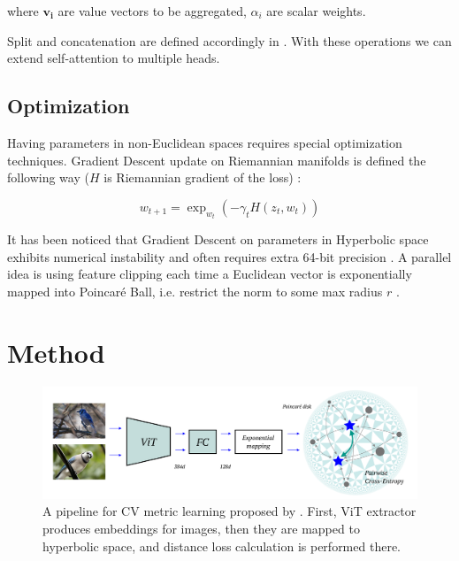 \documentclass[10pt, letterpaper, twocolumn]{article}
\begin{document}
where $\mathbf{v_i}$ are value vectors to be aggregated, $\alpha_i$ are scalar weights.

Split and concatenation are defined accordingly in \cite{shimizu_hyperbolic_2021}. With these operations we can extend self-attention to multiple heads.

\subsection{Optimization}

Having parameters in non-Euclidean spaces requires special optimization techniques. Gradient Descent update on Riemannian manifolds is defined the following way ($H$ is Riemannian gradient of the loss) \cite{bonnabel_stochastic_2013, becigneul_riemannian_2019}:

\begin{equation}
    w_{t+1}=\exp_{w_t}(-{\gamma_t} H(z_t,w_t))
\end{equation}

It has been noticed that Gradient Descent on parameters in Hyperbolic space exhibits numerical instability and often requires extra 64-bit precision \cite{mishne_numerical_2023}. A parallel idea is using feature clipping each time a Euclidean vector is exponentially mapped into Poincar\'e Ball, i.e. restrict the norm to some max radius $r$ \cite{guo_clipped_2022}.

\section{Method}\label{sec:method}

\begin{figure}
    \begin{center}
    \includegraphics[width=\linewidth]{scheme.pdf}
    \caption{A pipeline for CV metric learning proposed by \cite{ermolov_hyperbolic_2022}. First, ViT extractor produces embeddings for images, then they are mapped to hyperbolic space, and distance loss calculation is performed there.}
    \label{fig:scheme}
    \end{center}
\end{figure}
\end{document}
